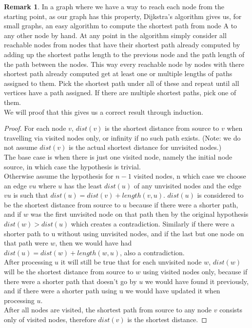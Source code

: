 \documentclass{article}
\theoremstyle{definition}
\newtheorem{remark}[theorem]{Remark}
\begin{document}
\begin{remark}
In a graph where we have a way to reach each node from the starting point, as our graph has this property, Dijkstra's algorithm gives us, for small graphs, an easy algorithm to compute the shortest path from node A to any other node by hand. At any point in the algorithm simply consider all reachable nodes from nodes that have their shortest path already computed by adding up the shortest paths length to the previous node and the path length of the path between the nodes. This way every reachable node by nodes with there shortest path already computed get at least one or multiple lengths of paths assigned to them. Pick the shortest path under all of these and repeat until all vertices have a path assigned. If there are multiple shortest paths, pick one of them. \\
We will proof that this gives us a correct result through induction.
\begin{proof} 
For each node $v$, $dist(v)$ is the shortest distance from source to $v$ when travelling via visited nodes only, or infinity if no such path exists. (Note: we do not assume $dist(v)$ is the actual shortest distance for unvisited nodes.) \\
The base case is when there is just one visited node, namely the initial node source, in which case the hypothesis is trivial. \\
Otherwise assume the hypothesis for $n-1$ visited nodes, n which case we choose an edge $vu$ where $u$ has the least $dist(u)$ of any unvisited nodes and the edge $vu$ is such that $dist(u) = dist(v) + length(v,u)$. $dist(u)$ is considered to be the shortest distance from source to $u$ because if there were a shorter path, and if $w$ was the first unvisited node on that path then by the original hypothesis $dist(w) > dist(u)$ which creates a contradiction. Similarly if there were a shorter path to u without using unvisited nodes, and if the last but one node on that path were $w$, then we would have had $dist(u) = dist(w) + length(w,u)$, also a contradiction. \\
After processing $u$ it will still be true that for each unvisited node $w$, $dist(w)$ will be the shortest distance from source to $w$ using visited nodes only, because if there were a shorter path that doesn't go by $u$ we would have found it previously, and if there were a shorter path using u we would have updated it when processing $u$. \\
After all nodes are visited, the shortest path from source to any node $v$ consists only of visited nodes, therefore $dist(v)$ is the shortest distance.
\end{proof}


\end{remark}
\end{document}
